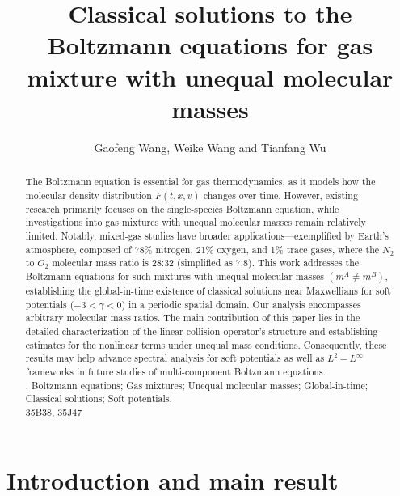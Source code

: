 \documentclass[reqno]{amsart}
\title[]%
{Classical solutions to the Boltzmann equations for  gas mixture with unequal molecular masses}
\author[
]{Gaofeng Wang, Weike Wang and Tianfang Wu}
\numberwithin{equation}{section}
\numberwithin{equation}{section}
\begin{document}
	
	
	\maketitle
	\begin{abstract}
	‌The Boltzmann equation is essential for gas thermodynamics, as it models how the molecular density distribution $F(t,x,v)$ changes over time. However, existing research primarily focuses on the single-species Boltzmann equation, while investigations into gas mixtures with unequal molecular masses remain relatively limited. Notably, mixed-gas studies have broader applications---exemplified by Earth's atmosphere, composed of 78\% nitrogen, 21\% oxygen, and 1\% trace gases, where the $N_2$ to $O_2$ molecular mass ratio is 28:32 (simplified as 7:8). This work addresses the Boltzmann equations for such mixtures with unequal molecular masses $(m^A\neq m^B)$, establishing the global-in-time existence of classical solutions near Maxwellians for soft potentials ($-3<\gamma<0$) in a periodic spatial domain. Our analysis encompasses arbitrary molecular mass ratios. ‌The main contribution of this paper lies in ‌the‌ detailed characterization of the linear collision operator's structure and establishing estimates for the nonlinear terms under unequal mass conditions.  ‌Consequently, these results‌ may help advance‌ spectral analysis for soft potentials ‌as well as $L^2-L^{\infty}$ frameworks in future studies of multi-component Boltzmann equations. \\
		
		. {Boltzmann equations; Gas mixtures; Unequal molecular masses; 
			Global-in-time; Classical solutions; Soft potentials.} \vspace{5pt}\\
		 {35B38, 35J47}
	\end{abstract}
	
	\allowdisplaybreaks
	
	
	\section{Introduction and main result}
	
\end{document}
